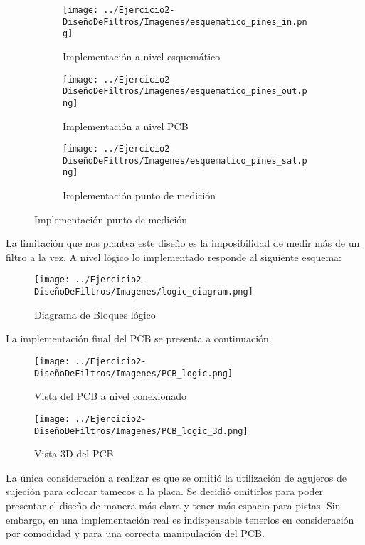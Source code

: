 \begin{figure}
      
 \centering
 \begin{subfigure}[b]{0.25\textwidth}
     \centering
     \texttt{[image: ../Ejercicio2-DiseñoDeFiltros/Imagenes/esquematico\_pines\_in.png]}
     \caption{Implementación a nivel esquemático}
 \end{subfigure}
 \hfill
 \begin{subfigure}[b]{0.25\textwidth}
     \centering
     \texttt{[image: ../Ejercicio2-DiseñoDeFiltros/Imagenes/esquematico\_pines\_out.png]}
     \caption{Implementación a nivel PCB}
 \end{subfigure}
 \hfill
 \begin{subfigure}[b]{0.25\textwidth}
    \centering
    \texttt{[image: ../Ejercicio2-DiseñoDeFiltros/Imagenes/esquematico\_pines\_sal.png]}
    \caption{Implementación punto de medición}
\end{subfigure}
\end{figure}

La limitación que nos plantea este diseño es la imposibilidad de medir más de un filtro a la vez. A nivel lógico lo implementado responde al siguiente 
esquema:

\begin{figure}[H]
    \centering
    \texttt{[image: ../Ejercicio2-DiseñoDeFiltros/Imagenes/logic\_diagram.png]}
    \caption{Diagrama de Bloques lógico}
\end{figure}

La implementación final del PCB se presenta a continuación.
\begin{figure}[H]
    \centering
    \texttt{[image: ../Ejercicio2-DiseñoDeFiltros/Imagenes/PCB\_logic.png]}
    \caption{Vista del PCB a nivel conexionado}
\end{figure}

\begin{figure}[H]
    \centering
    \texttt{[image: ../Ejercicio2-DiseñoDeFiltros/Imagenes/PCB\_logic\_3d.png]}
    \caption{Vista 3D del PCB}
\end{figure}


La única consideración a realizar es que se omitió la utilización de agujeros de sujeción para colocar tamecos a la placa. Se decidió omitirlos 
para poder presentar el diseño de manera más clara y tener más espacio para pistas. Sin embargo, en una implementación real es indispensable tenerlos 
en consideración por comodidad y para una correcta manipulación del PCB.

